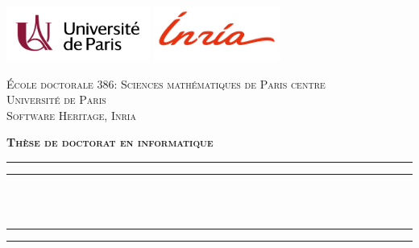 \begin{titlingpage*}
\begin{SingleSpace}
\calccentering{\unitlength}

\includegraphics[height=1.8cm]{img/frontmatter/uni_paris.pdf}  \hfill
\includegraphics[height=1.8cm]{img/frontmatter/inria.png} \hfill
{}

\begin{center}
\begin{otherlanguage}{french}

    \textsc{École doctorale 386: Sciences mathématiques de Paris centre}\\
\vspace{2mm}
\textsc{Université de Paris}\\
\vspace{2mm}
\textsc{Software Heritage, Inria}\\

\vspace{4mm}

\textsc{\Large \textbf{Thèse de doctorat en informatique}}\\

\vspace*{2mm}

\rule[0.5ex]{\linewidth}{2pt}\vspace*{-\baselineskip}\vspace*{3.2pt}
\rule[0.5ex]{\linewidth}{1pt}\\[\baselineskip]
\vspace{-0.35cm}
{\huge \thetitle{}}\\
\rule[0.5ex]{\linewidth}{1pt}\vspace*{-\baselineskip}\vspace*{3.4pt}
\rule[0.5ex]{\linewidth}{2pt}\\


\end{otherlanguage}
\end{center}
\end{SingleSpace}
\end{titlingpage*}
